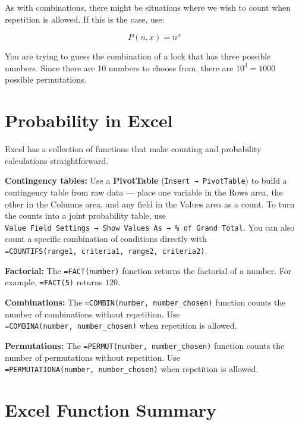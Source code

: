 \documentclass[
  11pt,
  letterpaper,
  DIV=11,
  numbers=noendperiod,
  oneside,
  open=any]{scrreprt}
\begin{document}
As with combinations, there might be situations where we wish to count
when repetition is allowed. If this is the case, use:

\begin{bsformula}

\[P(n,x)=n^x\]

\end{bsformula}

\begin{bsexample}[Example]

You are trying to guess the combination of a lock that has three
possible numbers. Since there are 10 numbers to choose from, there are
\(10^3=1000\) possible permutations.

\end{bsexample}

\section{Probability in Excel}\label{probability-in-excel}

Excel has a collection of functions that make counting and probability
calculations straightforward.

\textbf{Contingency tables:} Use a \textbf{PivotTable}
(\texttt{Insert\ →\ PivotTable}) to build a contingency table from raw
data --- place one variable in the Rows area, the other in the Columns
area, and any field in the Values area as a count. To turn the counts
into a joint probability table, use
\texttt{Value\ Field\ Settings\ →\ Show\ Values\ As\ →\ \%\ of\ Grand\ Total}.
You can also count a specific combination of conditions directly with
\texttt{=COUNTIFS(range1,\ criteria1,\ range2,\ criteria2)}.

\textbf{Factorial:} The \texttt{=FACT(number)} function returns the
factorial of a number. For example, \texttt{=FACT(5)} returns \(120\).

\textbf{Combinations:} The \texttt{=COMBIN(number,\ number\_chosen)}
function counts the number of combinations without repetition. Use
\texttt{=COMBINA(number,\ number\_chosen)} when repetition is allowed.

\textbf{Permutations:} The \texttt{=PERMUT(number,\ number\_chosen)}
function counts the number of permutations without repetition. Use
\texttt{=PERMUTATIONA(number,\ number\_chosen)} when repetition is
allowed.

\section{Excel Function Summary}\label{excel-function-summary-5}
\end{document}
